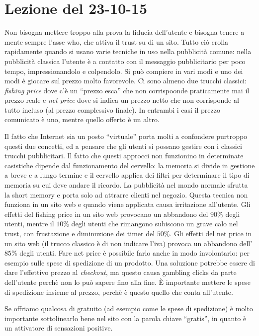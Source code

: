 \section{Lezione del 23-10-15}

Non bisogna mettere troppo alla prova la fiducia dell'utente e bisogna tenere a mente sempre l'asse who, che attiva il trust su di un sito. Tutto ci\`o crolla rapidamente quando si usano varie tecniche in uso nella pubblicit\`a comune: nella pubblicit\`a classica l'utente \`e a contatto con il messaggio pubblicitario per poco tempo, impressionandolo e colpendolo. Si pu\`o compiere in vari modi e uno dei modi \`e giocare sul prezzo molto favorevole. Ci sono almeno due trucchi classici: \textit{fishing price} dove c'\`e un ``prezzo esca'' che non corrispoonde praticamente mai il prezzo reale e \textit{net price} dove si indica un prezzo netto che non corrisponde al tutto incluso (al prezzo complessivo finale). In entrambi i casi il prezzo comunicato \`e uno, mentre quello offerto \`e un altro.

Il fatto che Internet sia un posto ``virtuale'' porta molti a confondere purtroppo questi due concetti, ed a pensare che gli utenti si possano gestire con i classici trucchi pubblicitari. Il fatto che questi approcci non funzionino in determinate casistiche dipende dal funzionamento del cervello: la memoria si divide in gestione a breve e a lungo termine e il cervello applica dei filtri per determinare il tipo di memoria su cui deve andare il ricordo. La pubblicit\`a nel mondo normale sfrutta la short memory e porta solo ad attrarre clienti nel negozio. Questa tecnica non funziona in un sito web e quando viene applicata causa irritazione all'utente.
Gli effetti del fishing price in un sito web provocano un abbandono del $90\%$ degli utenti, mentre il $10\%$ degli utenti che rimangono subiscono un grave calo nel trust, con frustazione e diminuzione dei timer del $50\%$.
Gli effetti del net price in un sito web (il trucco classico \`e di non indicare l'iva) provoca un abbandono dell'$85\%$ degli utenti. Fare net price \`e possibile farlo anche in modo involontario: per esempio sulle spese di spedizione di un prodotto. Una soluzione potrebbe essere di dare l'effettivo prezzo al \textit{checkout}, ma questo causa gambling clicks da parte dell'utente perch\`e non lo pu\`o sapere fino alla fine. \`E importante mettere le spese di spedizione insieme al prezzo, perch\`e \`e questo quello che conta all'utente.

Se offriamo qualcosa di gratuito (ad esempio come le spese di spedizione) \`e molto importante sottolinearlo bene nel sito con la parola chiave ``gratis'', in quanto \`e un attivatore di sensazioni positive.

